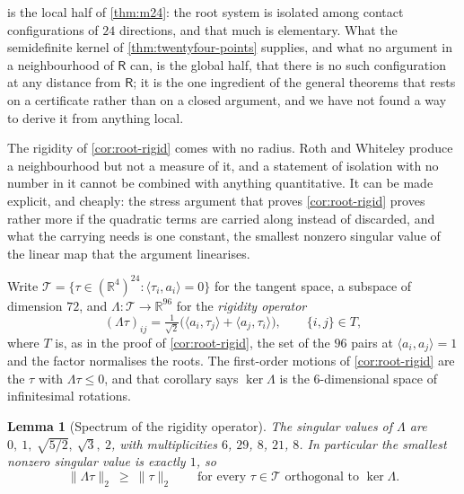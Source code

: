 \documentclass[11pt,reqno]{amsart}
\renewcommand{\_}{\origunderscore\allowbreak}
\numberwithin{equation}{section}
\theoremstyle{plain}
\newtheorem{lem}[thm]{Lemma}
\theoremstyle{definition}
\theoremstyle{remark}
\newcommand{\Rt}{\mathsf{R}}                 %
\begin{document}
 is the local half of \cref{thm:m24}: the root
system is isolated among contact configurations of $24$ directions, and
that much is elementary. What the semidefinite kernel of
\cref{thm:twentyfour-points} supplies, and what no argument in a
neighbourhood of $\Rt$ can, is the global half, that there is no such
configuration at any distance from $\Rt$; it is the one ingredient of
the general theorems that rests on a certificate rather than on a
closed argument, and we have not found a way to derive it from anything
local.

The rigidity of \cref{cor:root-rigid} comes with no radius. Roth and
Whiteley produce a neighbourhood but not a measure of it, and a
statement of isolation with no number in it cannot be combined with
anything quantitative. It can be made explicit, and cheaply: the stress
argument that proves \cref{cor:root-rigid} proves rather more if the
quadratic terms are carried along instead of discarded, and what the
carrying needs is one constant, the smallest nonzero singular value of
the linear map that the argument linearises.

Write $\mathcal{T}=\{\tau\in(\mathbb{R}^4)^{24}:\langle\tau_i,a_i\rangle=0\}$ for the
tangent space, a subspace of dimension $72$, and
$\Lambda\colon\mathcal{T}\to\mathbb{R}^{96}$ for the \emph{rigidity operator}
\begin{equation}\label{eq:rigidity-operator}
  (\Lambda\tau)_{ij}
  =\tfrac1{\sqrt2}\bigl(\langle a_i,\tau_j\rangle+\langle a_j,\tau_i\rangle\bigr),
  \qquad \{i,j\}\in T,
\end{equation}
where $T$ is, as in the proof of \cref{cor:root-rigid}, the set of
the $96$ pairs at $\langle a_i,a_j\rangle=1$ and the factor normalises the
roots. The first-order motions of
\cref{cor:root-rigid} are the $\tau$ with $\Lambda\tau\le0$, and that
corollary says $\ker\Lambda$ is the $6$-dimensional space of
infinitesimal rotations.

\begin{lem}[Spectrum of the rigidity operator]\label{lem:rigidity-spectrum}
The singular values of $\Lambda$ are
$0,\ 1,\ \sqrt{5/2},\ \sqrt3,\ 2$, with multiplicities
$6$, $29$, $8$, $21$, $8$. In particular the smallest nonzero singular
value is exactly $1$, so
\begin{equation}\label{eq:sigma-one}
  \|\Lambda\tau\|_2\ \ge\ \|\tau\|_2
  \qquad\text{for every } \tau\in\mathcal{T} \text{ orthogonal to } \ker\Lambda .
\end{equation}
\end{lem}
\end{document}
